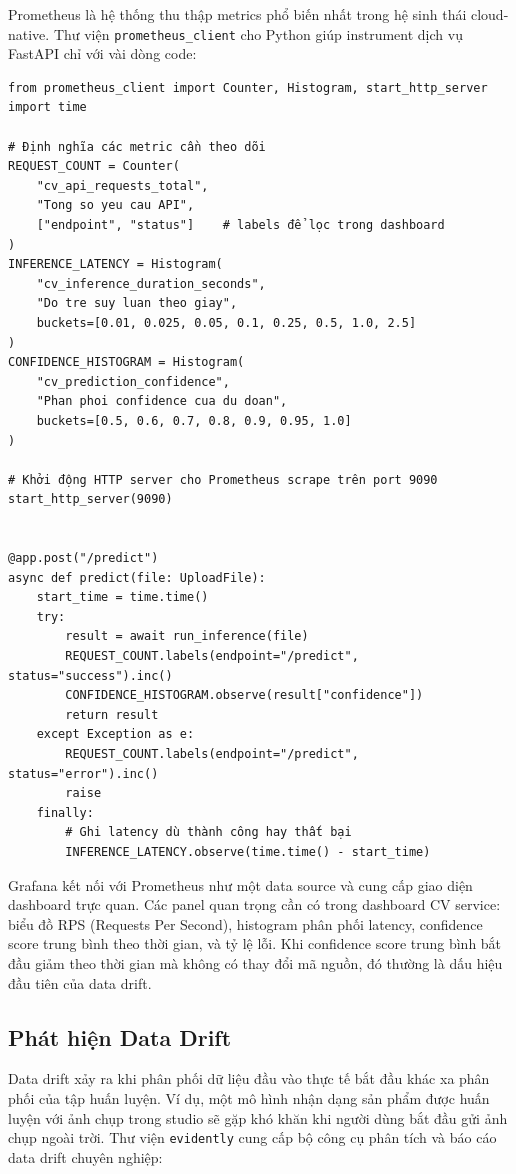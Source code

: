 Prometheus là hệ thống thu thập metrics phổ biến nhất trong hệ sinh thái cloud-native. Thư viện \texttt{prometheus\_client} cho Python giúp instrument dịch vụ FastAPI chỉ với vài dòng code:

\begin{verbatim}
from prometheus_client import Counter, Histogram, start_http_server
import time

# Định nghĩa các metric cần theo dõi
REQUEST_COUNT = Counter(
    "cv_api_requests_total",
    "Tong so yeu cau API",
    ["endpoint", "status"]    # labels để lọc trong dashboard
)
INFERENCE_LATENCY = Histogram(
    "cv_inference_duration_seconds",
    "Do tre suy luan theo giay",
    buckets=[0.01, 0.025, 0.05, 0.1, 0.25, 0.5, 1.0, 2.5]
)
CONFIDENCE_HISTOGRAM = Histogram(
    "cv_prediction_confidence",
    "Phan phoi confidence cua du doan",
    buckets=[0.5, 0.6, 0.7, 0.8, 0.9, 0.95, 1.0]
)

# Khởi động HTTP server cho Prometheus scrape trên port 9090
start_http_server(9090)


@app.post("/predict")
async def predict(file: UploadFile):
    start_time = time.time()
    try:
        result = await run_inference(file)
        REQUEST_COUNT.labels(endpoint="/predict", status="success").inc()
        CONFIDENCE_HISTOGRAM.observe(result["confidence"])
        return result
    except Exception as e:
        REQUEST_COUNT.labels(endpoint="/predict", status="error").inc()
        raise
    finally:
        # Ghi latency dù thành công hay thất bại
        INFERENCE_LATENCY.observe(time.time() - start_time)
\end{verbatim}

Grafana kết nối với Prometheus như một data source và cung cấp giao diện dashboard trực quan. Các panel quan trọng cần có trong dashboard CV service: biểu đồ RPS (Requests Per Second), histogram phân phối latency, confidence score trung bình theo thời gian, và tỷ lệ lỗi. Khi confidence score trung bình bắt đầu giảm theo thời gian mà không có thay đổi mã nguồn, đó thường là dấu hiệu đầu tiên của data drift.

\subsection*{Phát hiện Data Drift}

Data drift xảy ra khi phân phối dữ liệu đầu vào thực tế bắt đầu khác xa phân phối của tập huấn luyện. Ví dụ, một mô hình nhận dạng sản phẩm được huấn luyện với ảnh chụp trong studio sẽ gặp khó khăn khi người dùng bắt đầu gửi ảnh chụp ngoài trời. Thư viện \texttt{evidently} cung cấp bộ công cụ phân tích và báo cáo data drift chuyên nghiệp:

